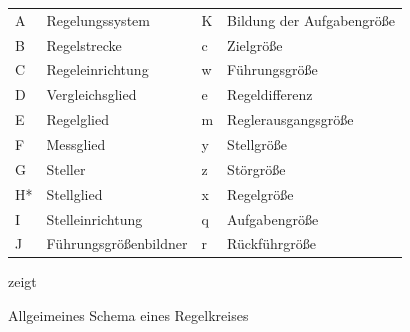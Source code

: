 \begin{figure}[ht!]
\vspace{0.25cm}
\begin{center}

\begin{tabular}{ll|ll}
	A  & Regelungssystem       & K & Bildung der Aufgabengröße \\
	B  & Regelstrecke          & c & Zielgröße                 \\
	C  & Regeleinrichtung      & w & Führungsgröße             \\
	D  & Vergleichsglied       & e & Regeldifferenz            \\
	E  & Regelglied            & m & Reglerausgangsgröße       \\
	F  & Messglied             & y & Stellgröße                \\
	G  & Steller               & z & Störgröße                 \\
	H* & Stellglied            & x & Regelgröße                \\
	I  & Stelleinrichtung      & q & Aufgabengröße             \\
	J  & Führungsgrößenbildner & r & Rückführgröße            
\end{tabular}
\caption{Allgeimeines Schema eines Regelkreises \cite{IEC60050-351}}
\label{fig:Contr}
\end{center}
\vspace{0.25cm}
 zeigt \missing\
\end{figure}















